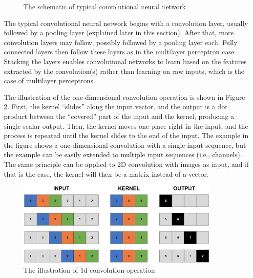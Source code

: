 \begin{figure}
    \caption{The schematic of typical convolutional neural network}
    \label{fig:ConvArch}
\end{figure}

The typical convolutional neural network begins with a convolution layer, usually followed by a pooling layer (explained later in this section). After that, more convolution layers may follow, possibly followed by a pooling layer each. Fully connected layers then follow these layers as in the multilayer perceptron case. Stacking the layers enables convolutional networks to learn based on the features extracted by the convolution(s) rather than learning on raw inputs, which is the case of multilayer perceptrons.

The illustration of the one-dimensional convolution operation is shown in Figure \ref{fig:Conv1d}. First, the kernel ``slides'' along the input vector, and the output is a dot product between the ``covered'' part of the input and the kernel, producing a single scalar output. Then, the kernel moves one place right in the input, and the process is repeated until the kernel slides to the end of the input. The example in the figure shows a one-dimensional convolution with a single input sequence, but the example can be easily extended to multiple input sequences (i.e., channels). The same principle can be applied to 2D convolution with images as input, and if that is the case, the kernel will then be a matrix instead of a vector.

\begin{figure}
    \centering
    \includegraphics[width=0.9\textwidth]{slike/Fig02_04.png}
    \caption{The illustration of 1d convolution operation}
    \label{fig:Conv1d}
\end{figure}

